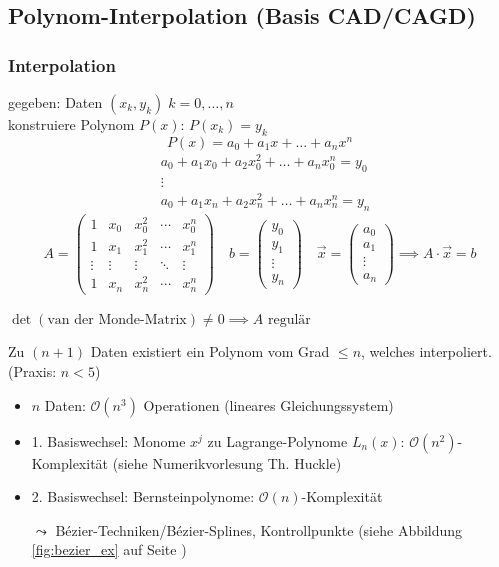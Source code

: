 
\subsection{Polynom-Interpolation (Basis CAD/CAGD)}

\subsubsection*{Interpolation}
\label{interpolation}%
gegeben: Daten $(x_k, y_k)\;k=0,\ldots,n$\\
konstruiere Polynom $P(x)$: $P(x_k) = y_k$
%
\[ P(x) = a_0 + a_1x + \ldots + a_nx^n \]
\vspace{-1cm}
\begin{align*}
&a_0 + a_1x_0 + a_2x_0^2 + \ldots + a_nx_0^n = y_0 \\
&\vdots \\
&a_0 + a_1x_n + a_2x_n^2 + \ldots + a_nx_n^n = y_n
\end{align*}
\[
A = 
\begin{pmatrix}
	1 & x_0 & x_0^2 & \cdots & x_0^n \\
	1 & x_1 & x_1^2 & \cdots & x_1^n \\
	\vdots & \vdots & \vdots & \ddots & \vdots \\
	1 & x_n & x_n^2 & \cdots & x_n^n
\end{pmatrix} \quad
b = \begin{pmatrix}	y_0 \\	y_1 \\	\vdots \\	y_n \end{pmatrix} \quad
\vec{x} = \begin{pmatrix}	a_0 \\	a_1 \\	\vdots \\	a_n \end{pmatrix}
\implies
A \cdot \vec{x} = b
\]

\noindent $\det(\text{van der Monde-Matrix}) \neq 0 \implies A\text{ regulär}$

\begin{proposition}
	Zu $(n + 1)$ Daten existiert ein Polynom vom Grad $\le n$, welches interpoliert. (Praxis: $n < 5$)
\end{proposition}

\begin{note}
  \begin{itemize}
    \item $n$ Daten: $\mathcal O (n^3)$ Operationen (lineares Gleichungssystem)
    \item 1. Basiswechsel: Monome $x^j$ zu Lagrange-Polynome $L_n(x)$: $\mathcal O (n^2)$-Komplexität (siehe Numerikvorlesung Th. Huckle)
    \item 2. Basiswechsel: Bernsteinpolynome: $\mathcal O (n)$-Komplexität
    \item[$\leadsto$] Bézier-Techniken/Bézier-Splines, Kontrollpunkte (siehe Abbildung \ref{fig:bezier_ex} auf Seite \pageref{fig:bezier_ex})
  \end{itemize}
\end{note}


